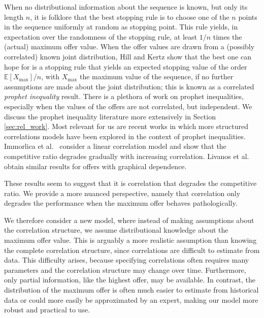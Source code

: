 \documentclass[11pt,a4paper]{article}
\numberwithin{equation}{section}
\begin{document}
When no distributional information about the sequence is known, but only its length $n$, it is folklore that the best stopping rule is to choose one of the $n$ points in the sequence uniformly at random as stopping point. This rule yields, in expectation over the randomness of the stopping rule, at least $1/n$ times the (actual) maximum offer value. When the offer values are drawn from a (possibly correlated) known joint distribution, Hill and Kertz \cite{hill1983stop} show that the best one can hope for is a stopping rule that yields an expected stopping value of the order $\mathbb{E}[X_{\max}]/n$, with $X_{\max}$ the maximum value of the sequence, if no further assumptions are made about the joint distribution; this is known as a correlated \textit{prophet inequality} result. There is a plethora of work on prophet inequalities, especially when the values of the offers are not correlated, but independent. We discuss the prophet inequality literature more extensively in Section \ref{sec:rel_work}.
Most relevant for us are recent works in which more structured correlations models have been explored in the context of prophet inequalities.
Immorlica et al.~\cite{immorlica2023prophet} consider a linear correlation model and show that the competitive ratio degrades gradually with increasing correlation.
Livanos et al.~\cite{livanos2024improved} obtain similar results for offers with graphical dependence.

These results seem to suggest that it is correlation that degrades the competitive ratio.
We provide a more nuanced perspective, namely that correlation only degrades the performance when the maximum offer behaves pathologically.

We therefore consider a new model, where instead of making assumptions about the correlation structure, we assume distributional knowledge about the maximum offer value. 
This is arguably a more realistic assumption than knowing the complete correlation structure, since correlations are difficult to estimate from data. This difficulty arises, because specifying correlations often requires many parameters and the correlation structure may change over time. Furthermore, only partial information, like the highest offer, may be available.
In contrast, the distribution of the maximum offer is often much easier to estimate from historical data or could more easily be approximated by an expert, making our model more robust and practical to use.
\end{document}
